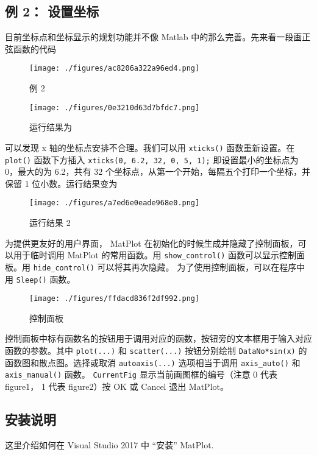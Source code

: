 \subsection{例 2： 设置坐标}

目前坐标点和坐标显示的规划功能并不像 Matlab 中的那么完善。先来看一段画正弦函数的代码

\begin{figure}[ht]
\centering
\texttt{[image: ./figures/ac8206a322a96ed4.png]}
\caption{例 2} \label{fig_MtPlot_5}
\end{figure}

\begin{figure}[ht]
\centering
\texttt{[image: ./figures/0e3210d63d7bfdc7.png]}
\caption{运行结果为} \label{fig_MtPlot_6}
\end{figure}

可以发现 x 轴的坐标点安排不合理。我们可以用 \verb|xticks()| 函数重新设置。在 \verb|plot()| 函数下方插入
\verb|xticks(0, 6.2, 32, 0, 5, 1);|
即设置最小的坐标点为 0，最大的为 6.2，共有 32 个坐标点，从第一个开始，每隔五个打印一个坐标，并保留 1 位小数。运行结果变为

\begin{figure}[ht]
\centering
\texttt{[image: ./figures/a7ed6e0eade968e0.png]}
\caption{运行结果 2} \label{fig_MtPlot_7}
\end{figure}

为提供更友好的用户界面， MatPlot 在初始化的时候生成并隐藏了控制面板，可以用于临时调用 MatPlot 的常用函数。用 \verb|show_control()| 函数可以显示控制面板。用 \verb|hide_control()| 可以将其再次隐藏。 为了使用控制面板，可以在程序中用 \verb|Sleep()| 函数。

\begin{figure}[ht]
\centering
\texttt{[image: ./figures/ffdacd836f2df992.png]}
\caption{控制面板} \label{fig_MtPlot_8}
\end{figure}

控制面板中标有函数名的按钮用于调用对应的函数，按钮旁的文本框用于输入对应函数的参数。其中 \verb|plot(...)| 和 \verb|scatter(...)| 按钮分别绘制 \verb|DataNo*sin(x)| 的函数图和散点图。选择或取消 \verb|autoaxis(...)| 选项相当于调用 \verb|axis_auto()| 和 \verb|axis_manual()| 函数。 \verb|CurrentFig| 显示当前画图框的编号（注意 0 代表 figure1， 1 代表 figure2）按 OK 或 Cancel 退出 MatPlot。


\subsection{安装说明}
这里介绍如何在 Visual Studio 2017 中 “安装” MatPlot. 

